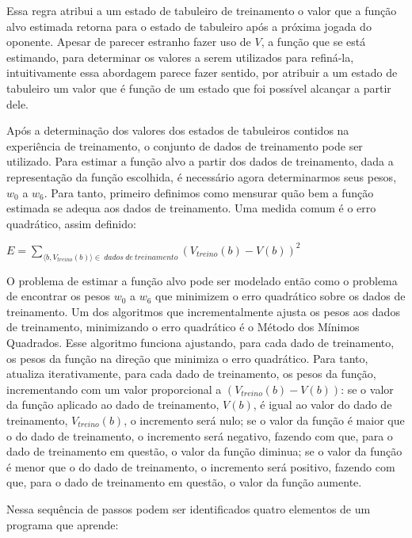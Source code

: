 Essa regra atribui a um estado de tabuleiro de treinamento o valor que a função alvo estimada retorna para o estado de tabuleiro após a próxima jogada do oponente. Apesar de parecer estranho fazer uso de $V$, a função que se está estimando, para determinar os valores a serem utilizados para refiná-la, intuitivamente essa abordagem parece fazer sentido, por atribuir a um estado de tabuleiro um valor que é função de um estado que foi possível alcançar a partir dele. 

Após a determinação dos valores dos estados de tabuleiros contidos na experiência de treinamento, o conjunto de dados de treinamento pode ser utilizado. Para estimar a função alvo a partir dos dados de treinamento, dada a representação da função escolhida, é necessário agora determinarmos seus pesos, $w_0$ a $w_6$. Para tanto, primeiro definimos como mensurar quão bem a função estimada se adequa aos dados de treinamento. Uma medida comum é o erro quadrático, assim definido:

$E = \sum\limits_{\langle b, V_{treino}(b) \rangle \in \ dados\ de\ treinamento} {(V_{treino}(b) - V(b))}^2$

O problema de estimar a função alvo pode ser modelado então como o problema de encontrar os pesos $w_0$ a $w_6$ que minimizem o erro quadrático sobre os dados de treinamento. Um dos algoritmos que incrementalmente ajusta os pesos aos dados de treinamento, minimizando o erro quadrático é o Método dos Mínimos Quadrados. Esse algoritmo funciona ajustando, para cada dado de treinamento, os pesos da função na direção que minimiza o erro quadrático. Para tanto, atualiza iterativamente, para cada dado de treinamento, os pesos da função, incrementando com um valor proporcional a $(V_{treino}(b) - V(b))$: se o valor da função aplicado ao dado de treinamento, $V(b)$, é igual ao valor do dado de treinamento, $V_{treino}(b)$, o incremento será nulo; se o valor da função é maior que o do dado de treinamento, o incremento será negativo, fazendo com que, para o dado de treinamento em questão, o valor da função diminua; se o valor da função é menor que o do dado de treinamento, o incremento será positivo, fazendo com que, para o dado de treinamento em questão, o valor da função aumente.

Nessa sequência de passos podem ser identificados quatro elementos de um programa que aprende:

